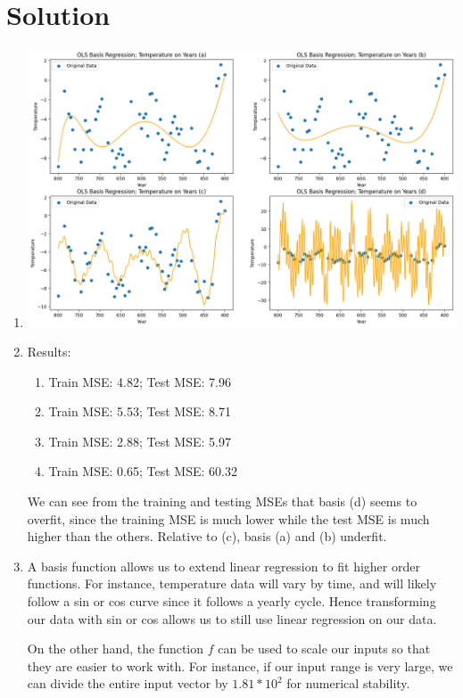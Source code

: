 \documentclass[submit]{harvardml}
\newenvironment{solution}
  {\color{magenta}\section*{Solution}}
{}
\begin{document}
\begin{solution}
\begin{enumerate}
    \item \begin{center}
        \includegraphics[scale=0.45]{4.1.png}
    \end{center}

    \item Results:
    \begin{enumerate}
        \item Train MSE: 4.82; Test MSE: 7.96 
        \item Train MSE: 5.53; Test MSE: 8.71
        \item Train MSE: 2.88; Test MSE: 5.97
        \item Train MSE: 0.65; Test MSE: 60.32
    \end{enumerate}
    We can see from the training and testing MSEs that basis (d) seems to overfit, since the training MSE is much lower while the test MSE is much higher than the others. Relative to (c), basis (a) and (b) underfit. 

    \item A basis function allows us to extend linear regression to fit higher order functions. For instance, temperature data will vary by time, and will likely follow a sin or cos curve since it follows a yearly cycle. Hence transforming our data with sin or cos allows us to still use linear regression on our data. 
    
    On the other hand, the function $f$ can be used to scale our inputs so that they are easier to work with. For instance, if our input range is very large, we can divide the entire input vector by $1.81 * 10^2$ for numerical stability. 
    

\end{enumerate}
\end{solution}
\end{document}
